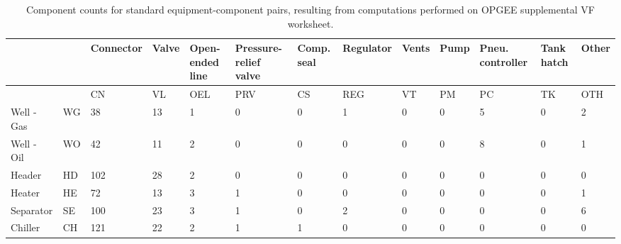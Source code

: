 \documentclass[11pt]{report}
\begin{document}
{{{{\begin{landscape}
\begin{table}[]
\begin{scriptsize}
\caption{Component counts for standard equipment-component pairs, resulting from computations performed on OPGEE supplemental VF worksheet.}
\label{tab:Std_Equipment_Component}
\begin{tabular*}{1\columnwidth}{p{}p{} | p{}p{}p{}p{}p{}p{}p{}p{}p{}p{}p{}}
\toprule
			&   &	Connector              & Valve & Open-ended line & Pressure-relief valve & Comp. seal & Regulator & Vents & Pump & Pneu. controller & Tank hatch & Other      \\
			\midrule
                       &       & CN              & VL                    & OEL             & PRV       & CS    & REG  & VT                            & PM              & PC                  & TK & OTH \\
                       \midrule
Well - Gas             & WG    & 38              & 13                    & 1               & 0         & 0     & 1    & 0                             & 0               & 5                   & 0  & 2   \\
Well - Oil             & WO    & 42              & 11                    & 2               & 0         & 0     & 0    & 0                             & 0               & 8                   & 0  & 1   \\
Header                 & HD    & 102             & 28                    & 2               & 0         & 0     & 0    & 0                             & 0               & 0                   & 0  & 0   \\
Heater                 & HE    & 72              & 13                    & 3               & 1         & 0     & 0    & 0                             & 0               & 0                   & 0  & 1   \\
Separator              & SE    & 100             & 23                    & 3               & 1         & 0     & 2    & 0                             & 0               & 0                   & 0  & 6   \\
Chiller                & CH    & 121             & 22                    & 2               & 1         & 1     & 0    & 0                             & 0               & 0                   & 0  & 0   \\

\end{tabular*}
\end{scriptsize}
\end{table}
\end{landscape}}}}}
\end{document}
